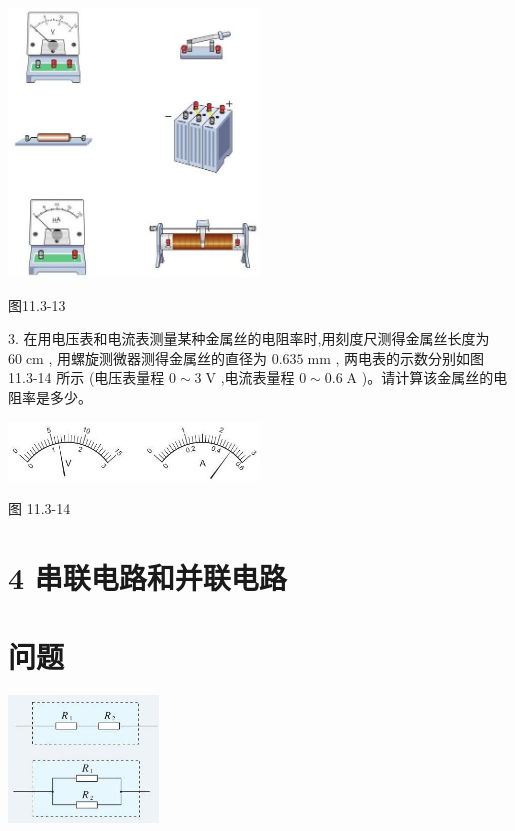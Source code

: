 \documentclass[10pt]{article}
\begin{document}
\begin{center}
\includegraphics[max width=0.5\textwidth]{images/01911d5f-8e38-70c0-b5b8-2b399bd115b6_72_544870.jpg}
\end{center}

图11.3-13

3. 在用电压表和电流表测量某种金属丝的电阻率时,用刻度尺测得金属丝长度为 \({60}\mathrm{\;{cm}}\) , 用螺旋测微器测得金属丝的直径为 \({0.635}\mathrm{\;{mm}}\) , 两电表的示数分别如图 11.3-14 所示 (电压表量程 \(0 \sim 3\mathrm{\;V}\) ,电流表量程 \(0 \sim {0.6}\mathrm{\;A}\) )。请计算该金属丝的电阻率是多少。

\begin{center}
\includegraphics[max width=0.5\textwidth]{images/01911d5f-8e38-70c0-b5b8-2b399bd115b6_72_871286.jpg}
\end{center}

图 11.3-14

\section*{4 串联电路和并联电路}

\section*{问题}

\begin{center}
\includegraphics[max width=0.3\textwidth]{images/01911d5f-8e38-70c0-b5b8-2b399bd115b6_73_447029.jpg}
\end{center}
\end{document}
